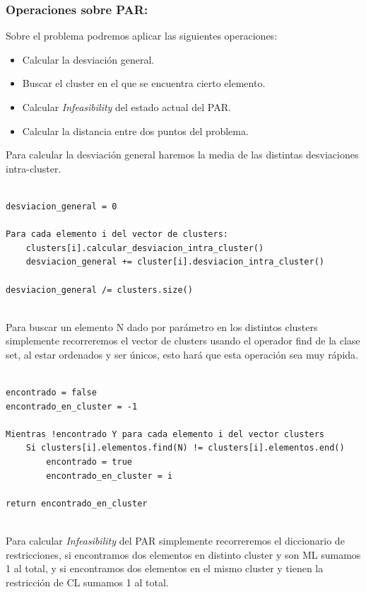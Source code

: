 \documentclass[12pt, spanish]{article}
\begin{document}
\newpage

\subsubsection{Operaciones sobre PAR:}

Sobre el problema podremos aplicar las siguientes operaciones:

\begin{itemize}
	\item {Calcular la desviación general.}
	\item {Buscar el cluster en el que se encuentra cierto elemento.}
	\item {Calcular \textit{Infeasibility} del estado actual del PAR.}
	\item {Calcular la distancia entre dos puntos del problema.}
\end{itemize}

Para calcular la desviación general haremos la media de las distintas desviaciones intra-cluster.


\begin{lstlisting}

desviacion_general = 0
	
Para cada elemento i del vector de clusters:
	clusters[i].calcular_desviacion_intra_cluster()
	desviacion_general += cluster[i].desviacion_intra_cluster()
		
desviacion_general /= clusters.size()	
	
\end{lstlisting}

Para buscar un elemento N dado por parámetro en los distintos clusters simplemente recorreremos el vector de clusters usando el operador find de la clase set, al estar ordenados y ser únicos, esto hará que esta operación sea muy rápida.

\begin{lstlisting}

encontrado = false
encontrado_en_cluster = -1

Mientras !encontrado Y para cada elemento i del vector clusters
	Si clusters[i].elementos.find(N) != clusters[i].elementos.end()
		encontrado = true	
		encontrado_en_cluster = i
		
return encontrado_en_cluster
	
\end{lstlisting}


Para calcular  \textit{Infeasibility} del PAR simplemente recorreremos el diccionario de restricciones, si encontramos dos elementos en distinto cluster y son ML sumamos 1 al total, y si encontramos dos elementos en el mismo cluster y tienen la restricción de CL sumamos 1 al total.
\end{document}
